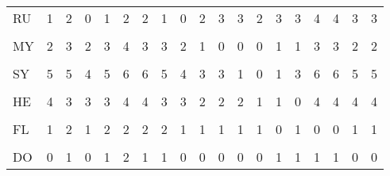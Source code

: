 \begin{table}[H]
\begin{tabular}[t]{lrrrrrrrrrrrrrrrrrr}
RU & 1 & 2 & 0 & 1 & 2 & 2 & 1 & 0 & 2 & 3 & 3 & 2 & 3 & 3 & 4 & 4 & 3 & 3\\
\cellcolor{gray!6}{VE} & \cellcolor{gray!6}{2} & \cellcolor{gray!6}{2} & \cellcolor{gray!6}{1} & \cellcolor{gray!6}{2} & \cellcolor{gray!6}{3} & \cellcolor{gray!6}{3} & \cellcolor{gray!6}{2} & \cellcolor{gray!6}{1} & \cellcolor{gray!6}{0} & \cellcolor{gray!6}{1} & \cellcolor{gray!6}{1} & \cellcolor{gray!6}{0} & \cellcolor{gray!6}{1} & \cellcolor{gray!6}{1} & \cellcolor{gray!6}{3} & \cellcolor{gray!6}{3} & \cellcolor{gray!6}{2} & \cellcolor{gray!6}{2}\\
MY & 2 & 3 & 2 & 3 & 4 & 3 & 3 & 2 & 1 & 0 & 0 & 0 & 1 & 1 & 3 & 3 & 2 & 2\\
\addlinespace
\cellcolor{gray!6}{KA} & \cellcolor{gray!6}{4} & \cellcolor{gray!6}{5} & \cellcolor{gray!6}{4} & \cellcolor{gray!6}{5} & \cellcolor{gray!6}{6} & \cellcolor{gray!6}{5} & \cellcolor{gray!6}{5} & \cellcolor{gray!6}{4} & \cellcolor{gray!6}{3} & \cellcolor{gray!6}{2} & \cellcolor{gray!6}{0} & \cellcolor{gray!6}{0} & \cellcolor{gray!6}{1} & \cellcolor{gray!6}{3} & \cellcolor{gray!6}{5} & \cellcolor{gray!6}{5} & \cellcolor{gray!6}{4} & \cellcolor{gray!6}{4}\\
SY & 5 & 5 & 4 & 5 & 6 & 6 & 5 & 4 & 3 & 3 & 1 & 0 & 1 & 3 & 6 & 6 & 5 & 5\\
\cellcolor{gray!6}{NO} & \cellcolor{gray!6}{6} & \cellcolor{gray!6}{6} & \cellcolor{gray!6}{5} & \cellcolor{gray!6}{6} & \cellcolor{gray!6}{6} & \cellcolor{gray!6}{7} & \cellcolor{gray!6}{6} & \cellcolor{gray!6}{5} & \cellcolor{gray!6}{4} & \cellcolor{gray!6}{4} & \cellcolor{gray!6}{2} & \cellcolor{gray!6}{1} & \cellcolor{gray!6}{0} & \cellcolor{gray!6}{3} & \cellcolor{gray!6}{5} & \cellcolor{gray!6}{5} & \cellcolor{gray!6}{6} & \cellcolor{gray!6}{6}\\
HE & 4 & 3 & 3 & 3 & 4 & 4 & 3 & 3 & 2 & 2 & 2 & 1 & 1 & 0 & 4 & 4 & 4 & 4\\
\cellcolor{gray!6}{OL} & \cellcolor{gray!6}{1} & \cellcolor{gray!6}{2} & \cellcolor{gray!6}{1} & \cellcolor{gray!6}{2} & \cellcolor{gray!6}{2} & \cellcolor{gray!6}{2} & \cellcolor{gray!6}{2} & \cellcolor{gray!6}{1} & \cellcolor{gray!6}{1} & \cellcolor{gray!6}{1} & \cellcolor{gray!6}{1} & \cellcolor{gray!6}{1} & \cellcolor{gray!6}{0} & \cellcolor{gray!6}{1} & \cellcolor{gray!6}{0} & \cellcolor{gray!6}{0} & \cellcolor{gray!6}{1} & \cellcolor{gray!6}{1}\\
\addlinespace
FL & 1 & 2 & 1 & 2 & 2 & 2 & 2 & 1 & 1 & 1 & 1 & 1 & 0 & 1 & 0 & 0 & 1 & 1\\
\cellcolor{gray!6}{PE} & \cellcolor{gray!6}{0} & \cellcolor{gray!6}{1} & \cellcolor{gray!6}{0} & \cellcolor{gray!6}{1} & \cellcolor{gray!6}{3} & \cellcolor{gray!6}{1} & \cellcolor{gray!6}{1} & \cellcolor{gray!6}{1} & \cellcolor{gray!6}{1} & \cellcolor{gray!6}{1} & \cellcolor{gray!6}{1} & \cellcolor{gray!6}{1} & \cellcolor{gray!6}{2} & \cellcolor{gray!6}{2} & \cellcolor{gray!6}{2} & \cellcolor{gray!6}{2} & \cellcolor{gray!6}{0} & \cellcolor{gray!6}{1}\\
DO & 0 & 1 & 0 & 1 & 2 & 1 & 1 & 0 & 0 & 0 & 0 & 0 & 1 & 1 & 1 & 1 & 0 & 0\\
\bottomrule
\end{tabular}
\end{table}
